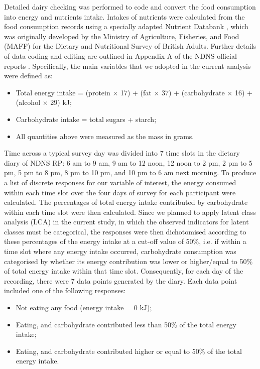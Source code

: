 Detailed dairy checking was performed to code and convert the food consumption into energy and nutrients intake. Intakes of nutrients were calculated from the food consumption records using a specially adapted Nutrient Databank \parencite{smithers1993maff}, which was originally developed by the Ministry of Agriculture, Fisheries, and Food (MAFF) for the Dietary and Nutritional Survey of British Adults. Further details of data
coding and editing are outlined in Appendix A of the NDNS official reports \parencite{NDNSofficial}. Specifically, the main variables that we adopted in the current analysis were defined as: 

\begin{itemize}
	\item Total energy intake = (protein $\times$ 17) + (fat $\times$ 37) + (carbohydrate $\times$ 16) + (alcohol $\times$ 29)  kJ;
	\item Carbohydrate intake = total sugars + starch; 
	\item All quantities above were measured as the mass in grams.
\end{itemize}

Time across a typical survey day was divided into 7 time slots in the dietary diary of NDNS RP: 6 am to 9 am, 9 am to 12 noon, 12 noon to 2 pm, 2 pm to 5 pm, 5 pm to 8 pm, 8 pm to 10 pm, and 10 pm to 6 am next morning. To produce a list of discrete responses for our variable of interest, the energy consumed within each time slot over the four days of survey for each participant were calculated. The percentages of total energy intake contributed by carbohydrate within each time slot were then calculated. Since we planned to apply latent class analysis (LCA) in the current study, in which the observed indicators for latent classes must be categorical, the responses were then dichotomised according to these percentages of the energy intake at a cut-off value of 50\%, i.e. if within a time slot where any energy intake occurred, carbohydrate consumption was categorised by whether its energy contribution was lower or higher/equal to 50\% of total energy intake within that time slot. Consequently, for each day of the recording, there were 7 data points generated by the diary. Each data point included one of the following responses:

\begin{itemize}
	\item Not eating any food (energy intake = 0 kJ); 
	\item Eating, and carbohydrate contributed less than 50\% of the total energy intake;
	\item Eating, and carbohydrate contributed higher or equal to 50\% of the total energy intake.
\end{itemize}
\vspace{-0.5cm}



